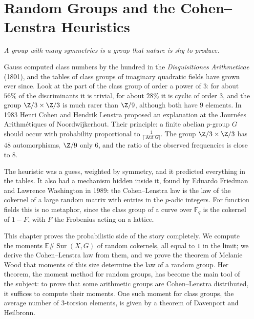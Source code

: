 \chapter{Random Groups and the Cohen--Lenstra Heuristics}\label{ch:cohenlenstra}
\begin{center}\itshape
A group with many symmetries is a group that nature is shy to produce.
\end{center}

Gauss computed class numbers by the hundred in the \emph{Disquisitiones Arithmeticae} (1801), and the tables of class groups of imaginary quadratic fields have grown ever since. Look at the part of the class group of order a power of $3$: for about $56\%$ of the discriminants it is trivial, for about $28\%$ it is cyclic of order $3$, and the group $\Z/3\times\Z/3$ is much rarer than $\Z/9$, although both have $9$ elements. In 1983 Henri Cohen and Hendrik Lenstra proposed an explanation at the Journées Arithmétiques of Noordwijkerhout. Their principle: a finite abelian $p$-group $G$ should occur with probability proportional to $\frac1{|\operatorname{Aut}G|}$. The group $\Z/3\times\Z/3$ has $48$ automorphisms, $\Z/9$ only $6$, and the ratio of the observed frequencies is close to $8$.

The heuristic was a guess, weighted by symmetry, and it predicted everything in the tables. It also had a mechanism hidden inside it, found by Eduardo Friedman and Lawrence Washington in 1989: the Cohen--Lenstra law is the law of the cokernel of a large random matrix with entries in the $p$-adic integers. For function fields this is no metaphor, since the class group of a curve over $\mathbb F_q$ is the cokernel of $1-F$, with $F$ the Frobenius acting on a lattice.

This chapter proves the probabilistic side of the story completely. We compute the moments $\mathbb E\#\operatorname{Sur}(X,G)$ of random cokernels, all equal to $1$ in the limit; we derive the Cohen--Lenstra law from them, and we prove the theorem of Melanie Wood that moments of this size determine the law of a random group. Her theorem, the moment method for random groups, has become the main tool of the subject: to prove that some arithmetic groups are Cohen--Lenstra distributed, it suffices to compute their moments. One such moment for class groups, the average number of $3$-torsion elements, is given by a theorem of Davenport and Heilbronn.

